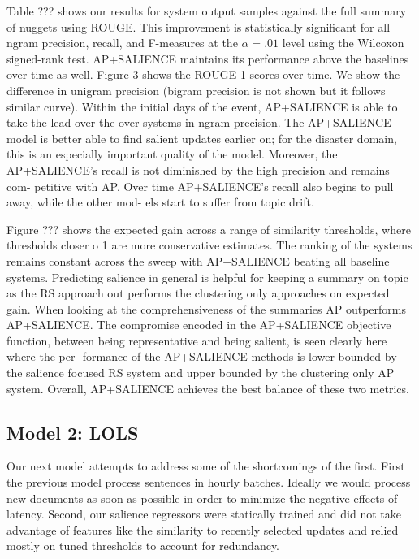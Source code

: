 Table  ???  shows  our  results  for  system  output
samples against the full summary of nuggets using ROUGE. This improvement is statistically significant  for  all  ngram  
precision,  recall,  and  F-measures at the
$\alpha=.01$
level using the Wilcoxon
signed-rank test.
AP+SALIENCE
maintains    its    performance
above  the  baselines  over  time  as  well.
Figure  3  shows  the  ROUGE-1  scores  over  time.
We  show  the  difference  in  unigram  precision
(bigram  precision  is  not  shown  but  it  follows
similar  curve).
Within  the  initial  days  of  the
event,  AP+SALIENCE
is  able  to  take  the  lead
over  the  over  systems  in  ngram  precision.   The
AP+SALIENCE
model is better able to find salient
updates earlier on; for the disaster domain, this is
an especially important quality of the model.
Moreover, the AP+SALIENCE’s recall is not diminished by the high precision and remains com-
petitive with AP. Over time AP+SALIENCE's recall also begins to pull away, while the other mod-
els start to suffer from topic drift.


Figure ??? shows the expected gain across a range
of  similarity  thresholds,  where  thresholds  closer
o 1 are more conservative estimates. The ranking
of the systems remains constant across the sweep
with AP+SALIENCE
beating all baseline systems.
Predicting salience in general is helpful for keeping a summary on topic as the  RS  approach out
performs  the  clustering  only  approaches  on  expected gain.
When looking at the comprehensiveness of the
summaries AP outperforms AP+SALIENCE.  
The compromise  encoded  in  the  AP+SALIENCE
objective function, between being representative and
being salient, is seen clearly here where the per-
formance of the AP+SALIENCE
methods is lower
bounded by the salience focused  RS  system and
upper bounded by the clustering only AP system.
Overall, AP+SALIENCE
achieves the best balance
of these two metrics.


\subsection{Model 2: LOLS}

Our next model attempts to address some of the shortcomings of the 
first. First the previous model process sentences in hourly batches.
Ideally we would process new documents as soon as possible in order 
to minimize the negative effects of latency. Second, our salience
regressors were statically trained and did not take advantage of features
like the similarity to recently selected updates and relied mostly on
tuned thresholds to account for redundancy. 

